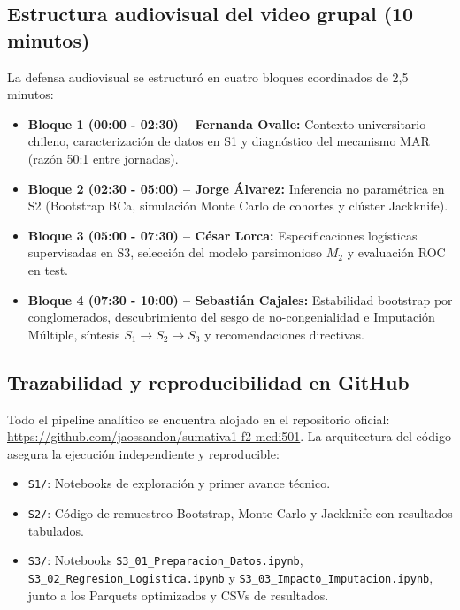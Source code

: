 \documentclass[11pt,a4paper]{article}
\newcommand{\proyRepo}{\url{https://github.com/jaossandon/sumativa1-f2-mcdi501}}
\begin{document}
\subsection{Estructura audiovisual del video grupal (10 minutos)}
La defensa audiovisual se estructuró en cuatro bloques coordinados de 2,5 minutos:
\begin{itemize}[leftmargin=*]
\item \textbf{Bloque 1 (00:00 - 02:30) -- Fernanda Ovalle:} Contexto universitario chileno, caracterización de datos en S1 y diagnóstico del mecanismo MAR (razón 50:1 entre jornadas).
\item \textbf{Bloque 2 (02:30 - 05:00) -- Jorge Álvarez:} Inferencia no paramétrica en S2 (Bootstrap BCa, simulación Monte Carlo de cohortes y clúster Jackknife).
\item \textbf{Bloque 3 (05:00 - 07:30) -- César Lorca:} Especificaciones logísticas supervisadas en S3, selección del modelo parsimonioso $M_2$ y evaluación ROC en test.
\item \textbf{Bloque 4 (07:30 - 10:00) -- Sebastián Cajales:} Estabilidad bootstrap por conglomerados, descubrimiento del sesgo de no-congenialidad e Imputación Múltiple, síntesis $S_1 \to S_2 \to S_3$ y recomendaciones directivas.
\end{itemize}

\subsection{Trazabilidad y reproducibilidad en GitHub}
Todo el pipeline analítico se encuentra alojado en el repositorio oficial: \proyRepo. La arquitectura del código asegura la ejecución independiente y reproducible:
\begin{itemize}[leftmargin=*]
\item \texttt{S1/}: Notebooks de exploración y primer avance técnico.
\item \texttt{S2/}: Código de remuestreo Bootstrap, Monte Carlo y Jackknife con resultados tabulados.
\item \texttt{S3/}: Notebooks \texttt{S3\_01\_Preparacion\_Datos.ipynb}, \texttt{S3\_02\_Regresion\_Logistica.ipynb} y \texttt{S3\_03\_Impacto\_Imputacion.ipynb}, junto a los Parquets optimizados y CSVs de resultados.
\end{itemize}
\end{document}
